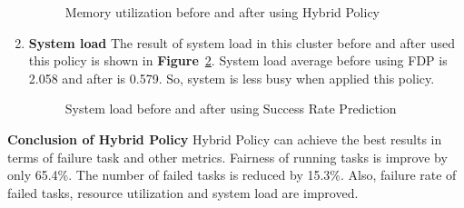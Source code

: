 \documentclass[12pt,oneside,openright,a4paper]{cpe-english-project}
\begin{document}
\begin{enumerate}
\begin{figure}[!h]
    \setlength{\fboxsep}{0cm}
    \caption{Memory utilization before and after using Hybrid Policy}\label{fig:mem3}
\end{figure}

  \item \textbf{System load}
  \newline
  The result of system load in this cluster before and after used this policy is shown in \textbf{Figure}~\ref{fig:load3}. System load average before using FDP is 2.058 and after is 0.579. So, system is less busy when applied this policy.
\begin{figure}[!h]\centering
    \setlength{\fboxrule}{0mm} %
    \setlength{\fboxsep}{0cm}
    \caption{System load before and after using Success Rate Prediction}\label{fig:load3}
\end{figure}
\end{enumerate}

\textbf{Conclusion of Hybrid Policy}
\newline
\hspace{10mm}Hybrid Policy can achieve the best results in terms of failure task and other metrics. Fairness of running tasks is improve by only 65.4\%. The number of failed tasks is reduced by 15.3\%. Also, failure rate of failed tasks, resource utilization and system load are improved.
\end{document}
